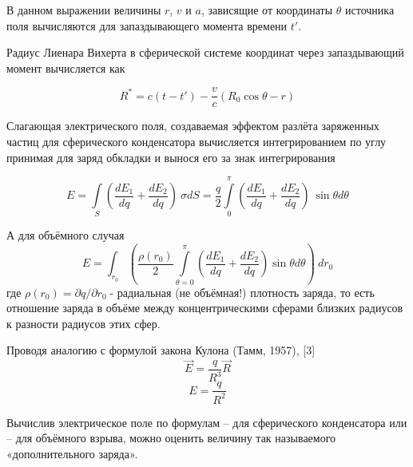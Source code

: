\documentclass[12pt]{article}
\begin{document}




В данном выражении величины $r$, $v$ и $a$, зависящие от координаты $\theta$ источника поля вычисляются для запаздывающего момента времени $t'$.

Радиус Лиенара Вихерта в сферической системе координат через запаздывающий момент вычисляется как

\[{{R}^{*}}=c\left( t-t' \right)-\frac{v}{c}\left( {{R}_{0}}\cos \theta -r \right)\]

Слагающая электрического поля, создаваемая эффектом разлёта заряженных частиц для сферического конденсатора вычисляется интегрированием по углу  принимая для  заряд обкладки и вынося его за знак интегрирования

	\[E=\int\limits_{S}{\left( \frac{d{{E}_{1}}}{dq}+\frac{d{{E}_{2}}}{dq} \right)\ }\sigma dS=\frac{q}{2}\int\limits_{0}^{\pi }{\left( \frac{d{{E}_{1}}}{dq}+\frac{d{{E}_{2}}}{dq} \right)}\ \sin \theta d\theta \]

А для объёмного случая
	\[E=\int_{{{r}_{0}}}{\left( \frac{\rho \left( {{r}_{0}} \right)}{2}\int\limits_{\theta =0}^{\pi }{\left( \frac{d{{E}_{1}}}{dq}+\frac{d{{E}_{2}}}{dq} \right)\sin \theta d\theta } \right)}\ d{{r}_{0}}\]
где ${\rho \left( {{r}_{0}} \right)=\partial q}/{\partial {{r}_{0}}}\;$- радиальная (не объёмная!) плотность заряда, то есть отношение заряда в объёме между концентрическими сферами близких радиусов к разности радиусов этих сфер.

Проводя аналогию с формулой закона Кулона (Тамм, 1957), [3]
	\[\overrightarrow{E}=\frac{q}{{{R}^{3}}} \overrightarrow{R}\] \[E=\frac{q}{{{R}^{2}}}\]

Вычислив электрическое поле по формулам  – для сферического конденсатора или  – для объёмного взрыва, можно оценить величину так называемого «дополнительного заряда».
\end{document}
